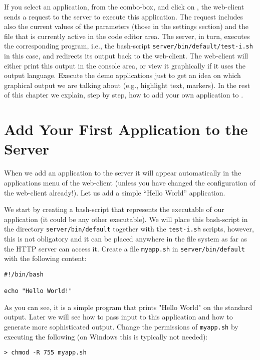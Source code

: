 If you select an application, from the combo-box, and click on
\applybutton, the web-client sends a request to the server to execute
this application. The request includes also the current values of the
parameters (those in the settings section) and the file that is
currently active in the code editor area.
%
The server, in turn, executes the corresponding program, i.e., the
bash-script \texttt{server/bin/default/test-i.sh} in this case, and
redirects its output back to the web-client.  
%
The web-client will either print this output in the console area, or
view it graphically if it uses the \ei output language. Execute the
demo applications just to get an idea on which graphical output we are
talking about (e.g., highlight text, markers).
%
In the rest of this chapter we explain, step by step, how to add your
own application to \ei.


\section{Add Your First Application to the \ei Server}

When we add an application to the \ei server it will appear
automatically in the applications menu of the web-client (unless you
have changed the configuration of the web-client already!).
%
Let us add a simple ``Hello World'' application.

We start by creating a bash-script that represents the executable of
our application (it could be any other executable). We will place this
bash-script in the directory \texttt{server/bin/default} together with
the \texttt{test-i.sh} scripts, however, this is not obligatory and it
can be placed anywhere in the file system as far as the HTTP server
can access it.
%
Create a file \texttt{myapp.sh} in \texttt{server/bin/default} with
the following content:

\medskip
\begin{lstlisting}[style=script]
#!/bin/bash

echo "Hello World!"
\end{lstlisting}

\medskip
\noindent
As you can see, it is a simple program that prints "Hello World" on
the standard output. Later we will see how to pass input to this
application and how to generate more sophisticated output.
%
Change the permissions of \texttt{myapp.sh} by executing the following
(on Windows this is typically not needed):

\medskip
\begin{lstlisting}
> chmod -R 755 myapp.sh
\end{lstlisting}

